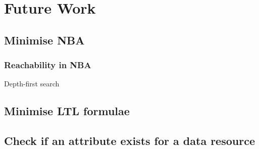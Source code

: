 \section{Future Work}
\subsection{Minimise NBA}
\cite{fritz2002state, hopcroft1971n, kan2016partial}
\subsubsection{Reachability in NBA}
Depth-first search
\subsection{Minimise LTL formulae}

\subsection{Check if an attribute exists for a data resource}

